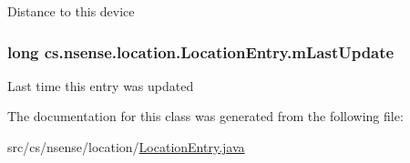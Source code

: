 Distance to this device \hypertarget{classcs_1_1nsense_1_1location_1_1_location_entry_ad9c3032440640ea31e08fd107c2f2efe}{
\subsubsection[{m\-Last\-Update}]{\setlength{\rightskip}{0pt plus 5cm}long cs.\-nsense.\-location.\-Location\-Entry.\-m\-Last\-Update\hspace{0.3cm}{\ttfamily [private]}}}\label{classcs_1_1nsense_1_1location_1_1_location_entry_ad9c3032440640ea31e08fd107c2f2efe}
Last time this entry was updated 

The documentation for this class was generated from the following file\-:\begin{DoxyCompactItemize}
\item 
src/cs/nsense/location/\hyperlink{_location_entry_8java}{Location\-Entry.\-java}\end{DoxyCompactItemize}
